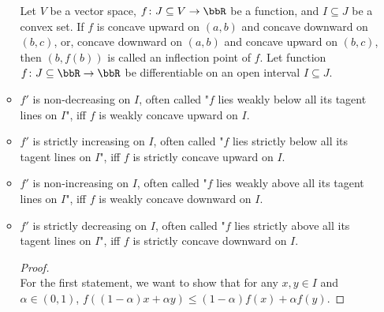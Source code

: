 \documentclass[a4paper,12pt]{report}
\begin{document}
\begin{itemize}
\begin{itemize}
Let $V$ be a vector space, $f\colon J\subseteq V\to\bbR$ be a function, and $I\subseteq J$ be a convex set. If $f$ is concave upward on $(a,b)$ and concave downward on $(b,c)$, or, concave downward on $(a,b)$ and concave upward on $(b,c)$, then $(b,f(b))$ is called an inflection point of $f$.
Let function $f\colon J\subseteq\bbR\to\bbR$ be differentiable on an open interval $I\subseteq J$.
\bit
\item $f'$ is non-decreasing on $I$, often called "$f$ lies weakly below all its tagent lines on $I$", iff $f$ is weakly concave upward on $I$.
\item $f'$ is strictly increasing on $I$, often called "$f$ lies strictly below all its tagent lines on $I$", iff $f$ is strictly concave upward on $I$.
\item $f'$ is non-increasing on $I$, often called "$f$ lies weakly above all its tagent lines on $I$", iff $f$ is weakly concave downward on $I$.
\item $f'$ is strictly decreasing on $I$, often called "$f$ lies strictly above all its tagent lines on $I$", iff $f$ is strictly concave downward on $I$.
\eit
\begin{proof}\mbox{}\\
    For the first statement, we want to show that for any $x,y\in I$ and $\alpha\in(0,1)$, $f((1-\alpha)x+\alpha y)\leq(1-\alpha)f(x)+\alpha f(y)$.


\end{proof}
\end{itemize}
\end{itemize}
\end{document}
